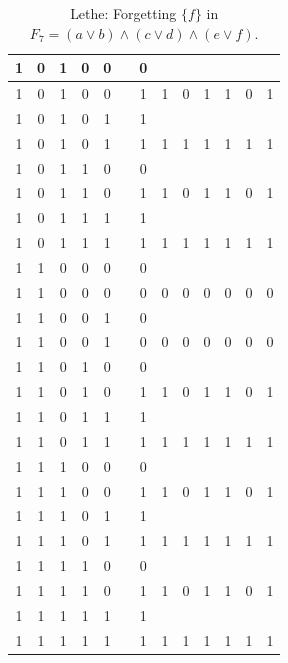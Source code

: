 \begin{table}[!tb]
\begin{tabular}{|c|c|c|c|c|c|c|c|c|c|c|c|c|}
        \rowcolor{gray!40} 1 & 0 & 1 & 0 & 0 &  & 0 &  &  &  &  &  &  \\ \hline
        \rowcolor{gray!40} 1 & 0 & 1 & 0 & 0 &  & 1 & 1 & 0 & 1 & 1 & 0 & 1 \\ \hline
        \rowcolor{blue!40} 1 & 0 & 1 & 0 & 1 &  & 1 &  &  &  &  &  &  \\ \hline
        \rowcolor{blue!40} 1 & 0 & 1 & 0 & 1 &  & 1 & 1 & 1 & 1 & 1 & 1 & 1 \\ \hline
        \rowcolor{red!40} 1 & 0 & 1 & 1 & 0 &  & 0 &  &  &  &  &  &  \\ \hline
        \rowcolor{red!40} 1 & 0 & 1 & 1 & 0 &  & 1 & 1 & 0 & 1 & 1 & 0 & 1 \\ \hline
        \rowcolor{green!40} 1 & 0 & 1 & 1 & 1 &  & 1 &  &  &  &  &  &  \\ \hline
        \rowcolor{green!40} 1 & 0 & 1 & 1 & 1 &  & 1 & 1 & 1 & 1 & 1 & 1 & 1 \\ \hline
        \rowcolor{yellow!40} 1 & 1 & 0 & 0 & 0 &  & 0 &  &  &  &  &  &  \\ \hline
        \rowcolor{yellow!40} 1 & 1 & 0 & 0 & 0 &  & 0 & 0 & 0 & 0 & 0 & 0 & 0 \\ \hline
        \rowcolor{gray!40} 1 & 1 & 0 & 0 & 1 &  & 0 &  &  &  &  &  &  \\ \hline
        \rowcolor{gray!40} 1 & 1 & 0 & 0 & 1 &  & 0 & 0 & 0 & 0 & 0 & 0 & 0 \\ \hline
        \rowcolor{blue!40} 1 & 1 & 0 & 1 & 0 &  & 0 &  &  &  &  &  &  \\ \hline
        \rowcolor{blue!40} 1 & 1 & 0 & 1 & 0 &  & 1 & 1 & 0 & 1 & 1 & 0 & 1 \\ \hline
        \rowcolor{red!40} 1 & 1 & 0 & 1 & 1 &  & 1 &  &  &  &  &  &  \\ \hline
        \rowcolor{red!40} 1 & 1 & 0 & 1 & 1 &  & 1 & 1 & 1 & 1 & 1 & 1 & 1 \\ \hline
        \rowcolor{green!40} 1 & 1 & 1 & 0 & 0 &  & 0 &  &  &  &  &  &  \\ \hline
        \rowcolor{green!40} 1 & 1 & 1 & 0 & 0 &  & 1 & 1 & 0 & 1 & 1 & 0 & 1 \\ \hline
        \rowcolor{yellow!40} 1 & 1 & 1 & 0 & 1 &  & 1 &  &  &  &  &  &  \\ \hline
        \rowcolor{yellow!40} 1 & 1 & 1 & 0 & 1 &  & 1 & 1 & 1 & 1 & 1 & 1 & 1 \\ \hline
        \rowcolor{gray!40} 1 & 1 & 1 & 1 & 0 &  & 0 &  &  &  &  &  &  \\ \hline
        \rowcolor{gray!40} 1 & 1 & 1 & 1 & 0 &  & 1 & 1 & 0 & 1 & 1 & 0 & 1 \\ \hline
        \rowcolor{blue!40} 1 & 1 & 1 & 1 & 1 &  & 1 &  &  &  &  &  &  \\ \hline
        \rowcolor{blue!40} 1 & 1 & 1 & 1 & 1 &  & 1 & 1 & 1 & 1 & 1 & 1 & 1 \\ \hline
    \end{tabular}
    \caption{Lethe: Forgetting $\{f\}$ in $F_{7} = (a \lor b) \land (c \lor d) \land (e \lor f)$.}
    \label{tab:lethe-F7-f}
\end{table}
